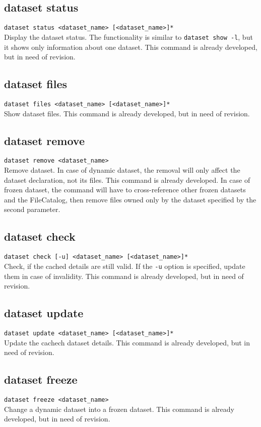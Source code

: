 \documentclass{scrreprt}
\begin{document}
\subsection{dataset status}
\texttt{dataset status <dataset_name> [<dataset_name>]*} \\
Display the dataset status. The functionality is similar to \texttt{dataset show -l}, but it shows only information about one dataset. This command is already developed, but in need of revision.

\subsection{dataset files}
\texttt{dataset files <dataset_name> [<dataset_name>]*} \\
Show dataset files. This command is already developed, but in need of revision.

\subsection{dataset remove}
\texttt{dataset remove <dataset_name>} \\
Remove dataset. In case of dynamic dataset, the removal will only affect the dataset declaration, not its files. This command is already developed. In case of frozen dataset, the command will have to cross-reference other frozen datasets and the FileCatalog, then remove files owned only by the dataset specified by the second parameter.

\subsection{dataset check}
\texttt{dataset check [-u] <dataset_name> [<dataset_name>]*} \\
Check, if the cached details are still valid. If the \texttt{-u} option is specified, update them in case of invalidity. This command is already developed, but in need of revision.

\subsection{dataset update}
\texttt{dataset update <dataset_name> [<dataset_name>]*} \\
Update the cachech dataset details. This command is already developed, but in need of revision.

\subsection{dataset freeze}
\texttt{dataset freeze <dataset_name>} \\
Change a dynamic dataset into a frozen dataset. This command is already developed, but in need of revision.  
\end{document}
